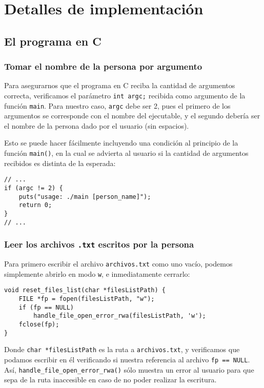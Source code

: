 \documentclass[a4paper]{article}
\begin{document}
\section{Detalles de implementación}

\subsection{El programa en C}

\subsubsection{Tomar el nombre de la persona por argumento}

Para asegurarnos que el programa en C reciba la cantidad de argumentos correcta, verificamos el parámetro \texttt{int argc;} recibida como argumento de la función \texttt{main}. Para nuestro caso, \texttt{argc} debe ser 2, pues el primero de los argumentos se corresponde con el nombre del ejecutable, y el segundo debería ser el nombre de la persona dado por el usuario (sin espacios).

Esto se puede hacer fácilmente incluyendo una condición al principio de la función \texttt{main()}, en la cual se advierta al usuario si la cantidad de argumentos recibidos es distinta de la esperada:

\begin{verbatim}
// ...
if (argc != 2) {
    puts("usage: ./main [person_name]");
    return 0;
}
// ...
\end{verbatim}

\subsubsection{Leer los archivos \texttt{.txt} escritos por la persona}

Para primero escribir el archivo \texttt{archivos.txt} como uno vacío, podemos simplemente abrirlo en modo \texttt{w}, e inmediatamente cerrarlo:

\begin{verbatim}
void reset_files_list(char *filesListPath) {
    FILE *fp = fopen(filesListPath, "w");
    if (fp == NULL)
        handle_file_open_error_rwa(filesListPath, 'w');
    fclose(fp);
}
\end{verbatim}

Donde \texttt{char *filesListPath} es la ruta a \texttt{archivos.txt}, y verificamos que podamos escribir en él verificando si nuestra referencia al archivo \texttt{fp == NULL}. Así, \texttt{handle_file_open_error_rwa()} sólo muestra un error al usuario para que sepa de la ruta inaccesible en caso de no poder realizar la escritura.
\end{document}
